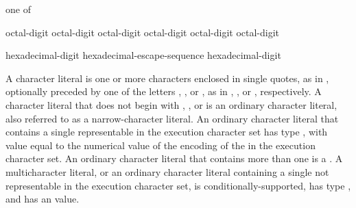 \begin{bnf}
 \textnormal{one of}\br
    \quad{}\quad{}\quad\terminal{\textbackslash\textbackslash}\br
    \quad{}\quad{}\quad{}\quad{}\quad{}\quad{}
\end{bnf}

\begin{bnf}
\br
    \terminal{\textbackslash} octal-digit\br
    \terminal{\textbackslash} octal-digit octal-digit\br
    \terminal{\textbackslash} octal-digit octal-digit octal-digit
\end{bnf}

\begin{bnf}
\br
     hexadecimal-digit\br
    hexadecimal-escape-sequence hexadecimal-digit
\end{bnf}

\pnum
{}%
%
%
%
A character literal is one or more characters enclosed in single quotes,
as in , optionally preceded by one of the letters ,
, or , as in , , or
, respectively.
%
A character literal that does not begin with , , or
 is an ordinary character literal, also referred to as a
narrow-character literal. An ordinary character literal that contains a
single  representable in the execution character
set has type , with value equal to the
numerical value of the encoding of the  in the
execution character set. An ordinary character literal that contains
more than one  is a
%
.
A multicharacter literal, or an ordinary character literal containing
a single  not representable in the execution
character set, is conditionally-supported, has type ,
%
and has an  value.

